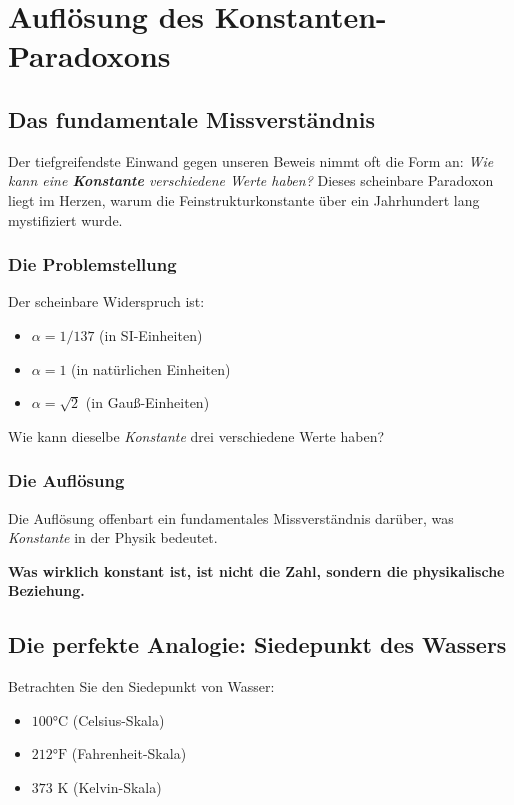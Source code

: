 	\section{Auflösung des Konstanten-Paradoxons}
	
	\subsection{Das fundamentale Missverständnis}
	
	Der tiefgreifendste Einwand gegen unseren Beweis nimmt oft die Form an: \textit{Wie kann eine \textbf{Konstante} verschiedene Werte haben?} Dieses scheinbare Paradoxon liegt im Herzen, warum die Feinstrukturkonstante über ein Jahrhundert lang mystifiziert wurde.
	
	\subsubsection{Die Problemstellung}
	
	Der scheinbare Widerspruch ist:
	\begin{itemize}
		\item $\alpha = 1/137$ (in SI-Einheiten)
		\item $\alpha = 1$ (in natürlichen Einheiten)
		\item $\alpha = \sqrt{2}$ (in Gauß-Einheiten)
	\end{itemize}
	
	Wie kann dieselbe \textit{Konstante} drei verschiedene Werte haben?
	
	\subsubsection{Die Auflösung}
	
	Die Auflösung offenbart ein fundamentales Missverständnis darüber, was \textit{Konstante} in der Physik bedeutet.
	
	\textbf{Was wirklich konstant ist, ist nicht die Zahl, sondern die physikalische Beziehung.}
	
	\subsection{Die perfekte Analogie: Siedepunkt des Wassers}
	
	Betrachten Sie den Siedepunkt von Wasser:
	\begin{itemize}
		\item $100°\text{C}$ (Celsius-Skala)
		\item $212°\text{F}$ (Fahrenheit-Skala)
		\item $373\text{ K}$ (Kelvin-Skala)
	\end{itemize}
	
